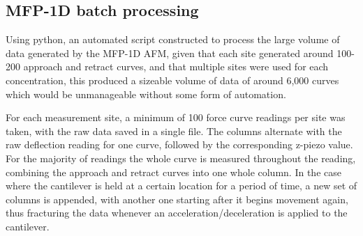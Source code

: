 \newpage
%



\subsection{MFP-1D batch processing}

Using python\cite{python}, an automated script constructed to process the large volume of data generated by the MFP-1D AFM, given that each site generated around 100-200 approach and retract curves, and that multiple sites were used for each concentration, this produced a sizeable volume of data of around 6,000 curves which would be unmanageable without some form of automation.


For each measurement site, a minimum of 100 force curve readings per site was taken, with the raw data saved in a single file. The columns alternate with the raw deflection reading for one curve, followed by the corresponding z-piezo value. For the majority of readings the whole curve is measured throughout the reading, combining the approach and retract curves into one whole column. In the case where the cantilever is held at a certain location for a period of time, a new set of columns is appended, with another one starting after it begins movement again, thus fracturing the data whenever an acceleration/deceleration is applied to the cantilever.


